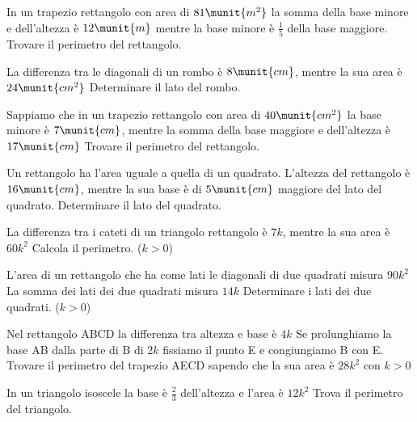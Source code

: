 \begin{htmulticols}{2}
\begin{esercizio}[*]
 \label{ese:6.64}
In un trapezio rettangolo con area di \(81\munit{m^2}\) la somma della base minore e dell'altezza è \(12\munit{m}\) mentre la base minore è \(\frac 1 5\) della base maggiore. Trovare il perimetro del rettangolo.
\end{esercizio}

\begin{esercizio}[*]
 \label{ese:6.65}
La differenza tra le diagonali di un rombo è \(8\munit{cm}\), mentre la sua area è \(24\munit{{cm}^2}\) Determinare il lato del rombo.
\end{esercizio}

\begin{esercizio}[*]
 \label{ese:6.66}
Sappiamo che in un trapezio rettangolo con area di \(40\munit{{cm}^2}\) la base minore è \(7\munit{cm}\), mentre la somma della base maggiore e dell'altezza è \(17\munit{cm}\) Trovare il perimetro del rettangolo.
\end{esercizio}

\begin{esercizio}[*]
 \label{ese:6.67}
Un rettangolo ha l'area uguale a quella di un quadrato. L'altezza del rettangolo è \(16\munit{cm}\), mentre la sua base è di \(5\munit{cm}\) maggiore del lato del quadrato. Determinare il lato del quadrato.
\end{esercizio}

\begin{esercizio}[*]
 \label{ese:6.68}
La differenza tra i cateti di un triangolo rettangolo è \(7k\), mentre la sua area è \(60 k^2\) Calcola il perimetro. (\(k>0\))
\end{esercizio}

\begin{esercizio}[*]
 \label{ese:6.69}
L'area di un rettangolo che ha come lati le diagonali di due quadrati misura \(90 k^2\) La somma dei lati dei due quadrati misura \(14k\) Determinare i lati dei due quadrati. (\( k>0 \))
\end{esercizio}

\begin{esercizio}[*]
 \label{ese:6.70}
Nel rettangolo ABCD la differenza tra altezza e base è \(4k\) Se prolunghiamo la base AB dalla parte di B di \(2k\) fissiamo il punto E e congiungiamo B con E. Trovare il perimetro del trapezio AECD sapendo che la sua area è \(28k^2\) con \(k>0\)
\end{esercizio}

\begin{esercizio}[*]
 \label{ese:6.71}
In un triangolo isoscele la base è \( \frac 2 3 \) dell'altezza e l'area è \(12k^2\) Trova il perimetro del triangolo.
\end{esercizio}
\end{htmulticols}


